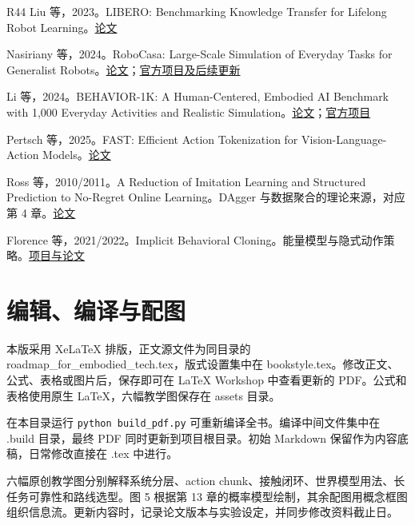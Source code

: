 \documentclass[UTF8,a4paper,11pt,oneside,openany,fontset=none]{ctexbook}
\begin{document}
\begin{thebibliography}{R44}
 Liu 等，2023。LIBERO: Benchmarking Knowledge Transfer for Lifelong Robot Learning。\href{https://arxiv.org/abs/2306.03310}{论文}

 Nasiriany 等，2024。RoboCasa: Large-Scale Simulation of Everyday Tasks for Generalist Robots。\href{https://arxiv.org/abs/2406.02523}{论文}；\href{https://robocasa.ai/}{官方项目及后续更新}

 Li 等，2024。BEHAVIOR-1K: A Human-Centered, Embodied AI Benchmark with 1,000 Everyday Activities and Realistic Simulation。\href{https://arxiv.org/abs/2403.09227}{论文}；\href{https://behavior.stanford.edu/}{官方项目}

 Pertsch 等，2025。FAST: Efficient Action Tokenization for Vision-Language-Action Models。\href{https://arxiv.org/abs/2501.09747}{论文}

 Ross 等，2010/2011。A Reduction of Imitation Learning and Structured Prediction to No-Regret Online Learning。DAgger 与数据聚合的理论来源，对应第 4 章。\href{https://arxiv.org/abs/1011.0686}{论文}

 Florence 等，2021/2022。Implicit Behavioral Cloning。能量模型与隐式动作策略。\href{https://implicitbc.github.io/}{项目与论文}
\end{thebibliography}

\chapter{编辑、编译与配图}

本版采用 XeLaTeX 排版，正文源文件为同目录的 roadmap\_for\_embodied\_tech.tex，版式设置集中在 bookstyle.tex。修改正文、公式、表格或图片后，保存即可在 LaTeX Workshop 中查看更新的 PDF。公式和表格使用原生 LaTeX，六幅教学图保存在 assets 目录。

在本目录运行 \texttt{python\ build\_pdf.py} 可重新编译全书。编译中间文件集中在 .build 目录，最终 PDF 同时更新到项目根目录。初始 Markdown 保留作为内容底稿，日常修改直接在 .tex 中进行。

六幅原创教学图分别解释系统分层、action chunk、接触闭环、世界模型用法、长任务可靠性和路线选型。图 5 根据第 13 章的概率模型绘制，其余配图用概念框图组织信息流。更新内容时，记录论文版本与实验设定，并同步修改资料截止日。
\end{document}
